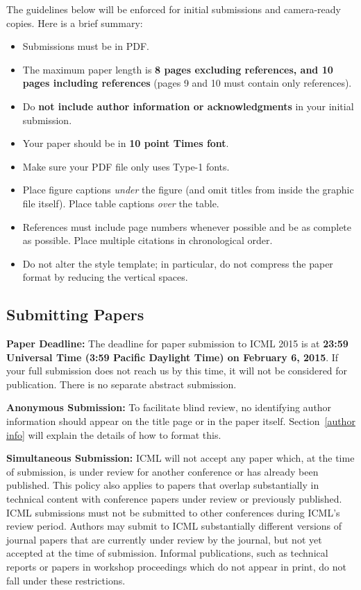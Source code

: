 \documentclass{article}
\begin{document}
The guidelines below will be enforced for initial submissions and
camera-ready copies.  Here is a brief summary:
\begin{itemize}
\item Submissions must be in PDF.
\item The maximum paper length is \textbf{8 pages excluding references, and 10 pages
  including references} (pages 9 and 10 must contain only references).
\item Do \textbf{not include author information or acknowledgments} in your initial
submission. 
\item Your paper should be in \textbf{10 point Times font}.
\item Make sure your PDF file only uses Type-1 fonts.
\item Place figure captions {\em under} the figure (and omit titles from inside
the graphic file itself).  Place table captions {\em over} the table.
\item References must include page numbers whenever possible and be as complete
as possible.  Place multiple citations in chronological order.  
\item Do not alter the style template; in particular, do not compress the paper
format by reducing the vertical spaces.
\end{itemize}

\subsection{Submitting Papers}

{\bf Paper Deadline:} The deadline for paper submission to ICML 2015
is at \textbf{23:59 Universal Time (3:59 Pacific Daylight Time) on February 6, 2015}.
If your full submission does not reach us by this time, it will 
not be considered for publication. There is no separate abstract submission.

{\bf Anonymous Submission:} To facilitate blind review, no identifying
author information should appear on the title page or in the paper
itself.  Section~\ref{author info} will explain the details of how to
format this.

{\bf Simultaneous Submission:} ICML will not accept any paper which,
at the time of submission, is under review for another conference or
has already been published. This policy also applies to papers that
overlap substantially in technical content with conference papers
under review or previously published. ICML submissions must not be
submitted to other conferences during ICML's review period. Authors
may submit to ICML substantially different versions of journal papers
that are currently under review by the journal, but not yet accepted
at the time of submission. Informal publications, such as technical
reports or papers in workshop proceedings which do not appear in
print, do not fall under these restrictions.
\end{document}
